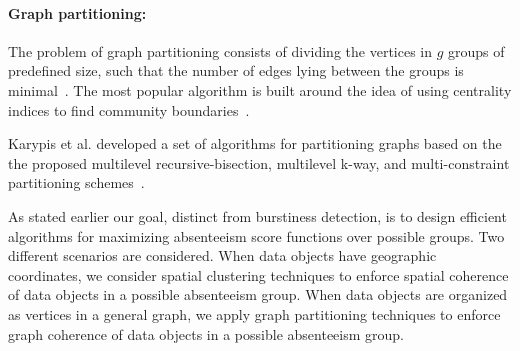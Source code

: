 \paragraph{Graph partitioning:}
The problem of graph partitioning consists of dividing the vertices in $g$ groups of predefined size, such that the number of edges lying between the groups is minimal~\cite{fortunato2010community}. The most popular algorithm is built around the idea of using centrality indices to find community boundaries~\cite{girvan2002community}. 
\iffalse
This algorithm is an iterative process with three components in each iteration: 1. Computation of the centrality for all edges;
2. Removal of edge with largest centrality: in case of ties with other edges, one of them is picked at random;
3. Recalculation of centralities for all the edges.
\fi
Karypis et al. developed a set of algorithms for partitioning graphs based on the the proposed multilevel recursive-bisection, multilevel k-way, and multi-constraint partitioning schemes~\cite{karypis2003multi, abou2006multilevel, lasalle2013multi}.

\noindent
As stated earlier our goal, distinct from burstiness detection, is to
design efficient algorithms for maximizing absenteeism score functions over possible groups.
Two different scenarios are considered. When data objects have geographic coordinates, we consider spatial clustering techniques to enforce spatial coherence of data objects in a possible absenteeism group. When data objects are organized as vertices in a general graph, we apply graph partitioning techniques to enforce graph coherence of data objects in a possible absenteeism group.
